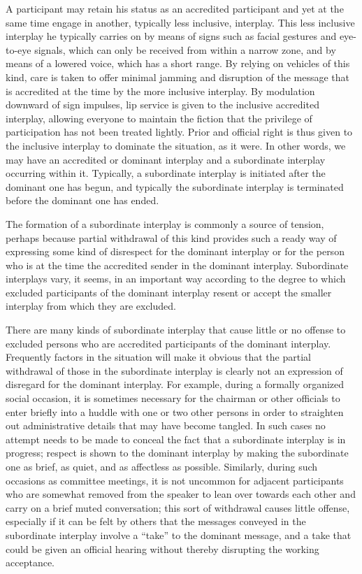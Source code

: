\documentclass[twoside,symmetric,nobib,justified]{tufte-book}
\begin{document}
A participant may retain his status as an accredited participant and yet
at the same time engage in another, typically less inclusive, interplay.
This less inclusive interplay he typically carries on by means of signs
such as facial gestures and eye-to-eye signals, which can only be
received from within a narrow zone, and by means of a lowered voice,
which has a short range. By relying on vehicles of this kind, care is
taken to offer minimal jamming and disruption of the message that is
accredited at the time by the more inclusive interplay. By modulation
downward of sign impulses, lip service is given to the inclusive
accredited interplay, allowing everyone to maintain the fiction that the
privilege of participation has not been treated lightly. Prior and
official right is thus given to the inclusive interplay to dominate the
situation, as it were. In other words, we may have an accredited or
dominant interplay and a subordinate interplay occurring within it.
Typically, a subordinate interplay is initiated after the dominant one
has begun, and typically the subordinate interplay is terminated before
the dominant one has ended.

The formation of a subordinate interplay is commonly a source of
tension, perhaps because partial withdrawal of this kind provides such a
ready way of expressing some kind of disrespect for the dominant
interplay or for the person who is at the time the accredited sender in
the dominant interplay. Subordinate interplays vary, it seems, in an
important way according to the degree to which excluded participants of
the dominant interplay resent or accept the smaller interplay from which
they are excluded.

There are many kinds of subordinate interplay that cause little or no
offense to excluded persons who are accredited participants of the
dominant interplay. Frequently factors in the situation will make it
obvious that the partial withdrawal of those in the subordinate
interplay is clearly not an expression of disregard for the dominant
interplay. For example, during a formally organized social occasion, it
is sometimes necessary for the chairman or other officials to enter
briefly into a huddle with one or two other persons in order to
straighten out administrative details that may have become tangled. In
such cases no attempt needs to be made to conceal the fact that a
subordinate interplay is in progress; respect is shown to the dominant
interplay by making the subordinate one as brief, as quiet, and as
affectless as possible. Similarly, during such occasions as committee
meetings, it is not uncommon for adjacent participants who are somewhat
removed from the speaker to lean over towards each other and carry on a
brief muted conversation; this sort of withdrawal causes little offense,
especially if it can be felt by others that the messages conveyed in the
subordinate interplay involve a ``take'' to the dominant message, and a
take that could be given an official hearing without thereby disrupting
the working acceptance.
\end{document}

